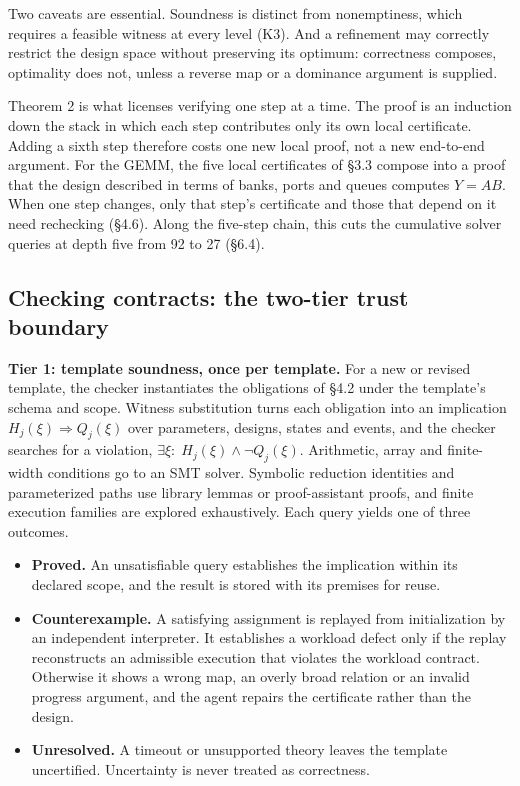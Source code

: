 \documentclass[11pt]{article}
\providecommand{\tightlist}{\setlength{\itemsep}{0pt}\setlength{\parskip}{0pt}}
\begin{document}
Two caveats are essential. Soundness is distinct from nonemptiness, which requires a feasible witness at every level (K3). And a refinement may correctly restrict the design space without preserving its optimum: correctness composes, optimality does not, unless a reverse map or a dominance argument is supplied.

Theorem 2 is what licenses verifying one step at a time. The proof is an induction down the stack in which each step contributes only its own local certificate. Adding a sixth step therefore costs one new local proof, not a new end-to-end argument. For the GEMM, the five local certificates of §3.3 compose into a proof that the design described in terms of banks, ports and queues computes \(Y=AB\). When one step changes, only that step's certificate and those that depend on it need rechecking (§4.6). Along the five-step chain, this cuts the cumulative solver queries at depth five from 92 to 27 (§6.4).

\hypertarget{checking-contracts-the-two-tier-trust-boundary}{%
\subsection{Checking contracts: the two-tier trust boundary}\label{checking-contracts-the-two-tier-trust-boundary}}

\textbf{Tier 1: template soundness, once per template.} For a new or revised template, the checker instantiates the obligations of §4.2 under the template's schema and scope. Witness substitution turns each obligation into an implication \(H_j(\xi)\Rightarrow Q_j(\xi)\) over parameters, designs, states and events, and the checker searches for a violation, \(\exists\xi:\;H_j(\xi)\land\neg Q_j(\xi)\). Arithmetic, array and finite-width conditions go to an SMT solver. Symbolic reduction identities and parameterized paths use library lemmas or proof-assistant proofs, and finite execution families are explored exhaustively. Each query yields one of three outcomes.

\begin{itemize}
\tightlist
\item
  \textbf{Proved.} An unsatisfiable query establishes the implication within its declared scope, and the result is stored with its premises for reuse.
\item
  \textbf{Counterexample.} A satisfying assignment is replayed from initialization by an independent interpreter. It establishes a workload defect only if the replay reconstructs an admissible execution that violates the workload contract. Otherwise it shows a wrong map, an overly broad relation or an invalid progress argument, and the agent repairs the certificate rather than the design.
\item
  \textbf{Unresolved.} A timeout or unsupported theory leaves the template uncertified. Uncertainty is never treated as correctness.
\end{itemize}
\end{document}
